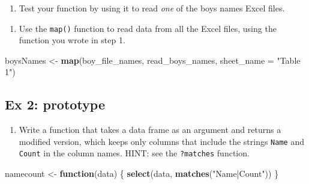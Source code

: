 \documentclass[
]{book}
\newenvironment{Shaded}{\begin{snugshade}}{\end{snugshade}}
\newcommand{\ControlFlowTok}[1]{\textcolor[rgb]{0.13,0.29,0.53}{\textbf{#1}}}
\newcommand{\DataTypeTok}[1]{\textcolor[rgb]{0.13,0.29,0.53}{#1}}
\newcommand{\DecValTok}[1]{\textcolor[rgb]{0.00,0.00,0.81}{#1}}
\newcommand{\KeywordTok}[1]{\textcolor[rgb]{0.13,0.29,0.53}{\textbf{#1}}}
\newcommand{\NormalTok}[1]{#1}
\newcommand{\OperatorTok}[1]{\textcolor[rgb]{0.81,0.36,0.00}{\textbf{#1}}}
\newcommand{\StringTok}[1]{\textcolor[rgb]{0.31,0.60,0.02}{#1}}
\providecommand{\tightlist}{%
  \setlength{\itemsep}{0pt}\setlength{\parskip}{0pt}}
\begin{document}
\begin{enumerate}
\def\labelenumi{\arabic{enumi}.}
\setcounter{enumi}{1}
\tightlist
\item
  Test your function by using it to read \emph{one} of the boys names Excel files.
\end{enumerate}

\begin{Shaded}
\end{Shaded}

\begin{enumerate}
\def\labelenumi{\arabic{enumi}.}
\setcounter{enumi}{2}
\tightlist
\item
  Use the \texttt{map()} function to read data from all the Excel files, using the function you wrote in step 1.
\end{enumerate}

\begin{Shaded}
\begin{Highlighting}[]
\NormalTok{boysNames <-}\StringTok{ }\KeywordTok{map}\NormalTok{(boy_file_names, read_boys_names, }\DataTypeTok{sheet_name =} \StringTok{"Table 1"}\NormalTok{)}
\end{Highlighting}
\end{Shaded}

\hypertarget{ex-2-prototype-2}{%
\subsection{Ex 2: prototype}\label{ex-2-prototype-2}}

\begin{enumerate}
\def\labelenumi{\arabic{enumi}.}
\tightlist
\item
  Write a function that takes a data frame as an argument and returns a modified version, which keeps only columns that include the strings \texttt{Name} and \texttt{Count} in the column names. HINT: see the \texttt{?matches} function.
\end{enumerate}

\begin{Shaded}
\begin{Highlighting}[]
\NormalTok{  namecount <-}\StringTok{ }\ControlFlowTok{function}\NormalTok{(data) \{}
      \KeywordTok{select}\NormalTok{(data, }\KeywordTok{matches}\NormalTok{(}\StringTok{"Name|Count"}\NormalTok{))}
\NormalTok{  \}}
\end{Highlighting}
\end{Shaded}
\end{document}
